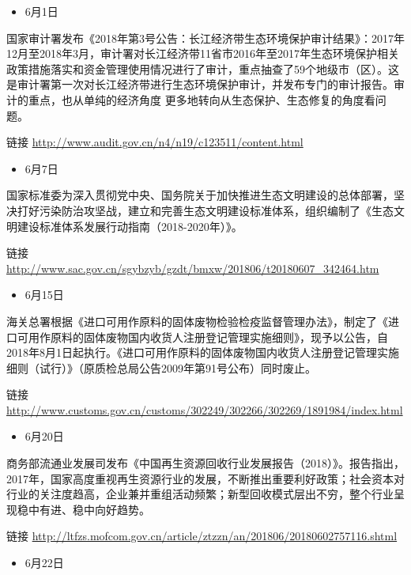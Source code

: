 \documentclass[]{book}
\providecommand{\tightlist}{%
  \setlength{\itemsep}{0pt}\setlength{\parskip}{0pt}}
\begin{document}
\begin{itemize}
\tightlist
\item
  6月1日
\end{itemize}

国家审计署发布《2018年第3号公告：长江经济带生态环境保护审计结果》：2017年12月至2018年3月，审计署对长江经济带11省市2016年至2017年生态环境保护相关政策措施落实和资金管理使用情况进行了审计，重点抽查了59个地级市（区）。这是审计署第一次对长江经济带进行生态环境保护审计，并发布专门的审计报告。审计的重点，也从单纯的经济角度
更多地转向从生态保护、生态修复的角度看问题。

链接 \url{http://www.audit.gov.cn/n4/n19/c123511/content.html}

\begin{itemize}
\tightlist
\item
  6月7日
\end{itemize}

国家标准委为深入贯彻党中央、国务院关于加快推进生态文明建设的总体部署，坚决打好污染防治攻坚战，建立和完善生态文明建设标准体系，组织编制了《生态文明建设标准体系发展行动指南（2018-2020年）》。

链接
\url{http://www.sac.gov.cn/sgybzyb/gzdt/bmxw/201806/t20180607_342464.htm}

\begin{itemize}
\tightlist
\item
  6月15日
\end{itemize}

海关总署根据《进口可用作原料的固体废物检验检疫监督管理办法》，制定了《进口可用作原料的固体废物国内收货人注册登记管理实施细则》，现予以公告，自2018年8月1日起执行。《进口可用作原料的固体废物国内收货人注册登记管理实施细则（试行）》（原质检总局公告2009年第91号公布）同时废止。

链接
\url{http://www.customs.gov.cn/customs/302249/302266/302269/1891984/index.html}

\begin{itemize}
\tightlist
\item
  6月20日
\end{itemize}

商务部流通业发展司发布《中国再生资源回收行业发展报告（2018）》。报告指出，2017年，国家高度重视再生资源行业的发展，不断推出重要利好政策；社会资本对行业的关注度趋高，企业兼并重组活动频繁；新型回收模式层出不穷，整个行业呈现稳中有进、稳中向好趋势。

链接
\url{http://ltfzs.mofcom.gov.cn/article/ztzzn/an/201806/20180602757116.shtml}

\begin{itemize}
\tightlist
\item
  6月22日
\end{itemize}
\end{document}
